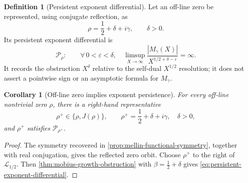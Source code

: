 \documentclass[11pt,a4paper]{article}
\newtheorem{corollary}[theorem]{Corollary}
\theoremstyle{definition}
\newtheorem{definition}[theorem]{Definition}
\newcommand{\CriticalLine}{\mathcal{L}_{1/2}}
\newcommand{\Dual}{J}
\begin{document}
\begin{definition}[Persistent exponent differential]
\label{def:persistent-exponent-differential}
Let an off-line zero be represented, using conjugate reflection, as
\[
  \rho=\frac12+\delta+i\gamma,
  \qquad
  \delta>0.
\]
Its persistent exponent differential is
\begin{equation}
\label{eq:persistent-exponent-differential}
  \mathcal P_\rho:
  \qquad
  \forall\,0<\varepsilon<\delta,\quad
  \limsup_{X\to\infty}
  \frac{|M_\gamma(X)|}
       {X^{1/2+\delta-\varepsilon}}
  =\infty.
\end{equation}
It records the obstruction $X^\delta$ relative to the self-dual
$X^{1/2}$ resolution; it does not assert a pointwise sign or an asymptotic
formula for $M_\gamma$.
\end{definition}

\begin{corollary}[Off-line zero implies exponent persistence]
\label{cor:off-line-zero-implies-persistence}
For every off-line nontrivial zero $\rho$, there is a right-hand representative
\[
  \rho^+\in\{\rho,\Dual(\rho)\},
  \qquad
  \rho^+=\frac12+\delta+i\gamma,
  \quad\delta>0,
\]
and $\rho^+$ satisfies $\mathcal P_{\rho^+}$.
\end{corollary}

\begin{proof}
The symmetry recovered in \cref{prop:mellin-functional-symmetry}, together with
real conjugation, gives the reflected zero orbit. Choose $\rho^+$ to the right
of $\CriticalLine$. Then
\cref{thm:mobius-growth-obstruction} with
$\beta=\tfrac12+\delta$ gives
\cref{eq:persistent-exponent-differential}.
\end{proof}
\end{document}
